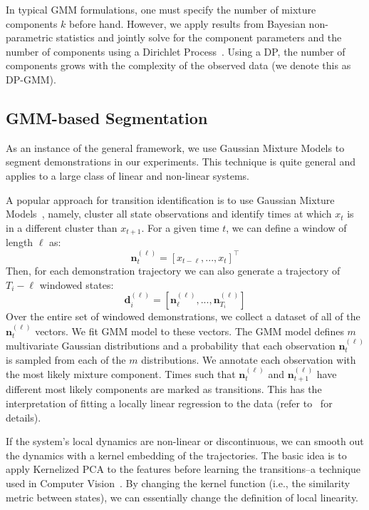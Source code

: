 In typical GMM formulations, one must specify the number of mixture components $k$ before hand.
However, we apply results from Bayesian non-parametric statistics and jointly solve for the component parameters and the number of components using a Dirichlet Process~\cite{kulis2011revisiting}.
Using a DP, the number of components grows with the complexity of the observed data (we denote this as DP-GMM).

\subsection{GMM-based Segmentation}\label{segm}
As an instance of the general framework, we use Gaussian Mixture Models to segment demonstrations in our experiments.
This technique is quite general and applies to a large class of linear and non-linear systems.

A popular approach for transition identification is to use Gaussian Mixture Models~\cite{calinon2014skills}, namely, cluster all state observations and identify times at which $x_t$ is in a different cluster than $x_{t+1}$.
For a given time $t$, we can define a window of length $\ell$ as:
\[
\mathbf{n}^{(\ell)}_t = [x_{t-\ell},...,x_{t}]^\intercal
\]
Then, for each demonstration trajectory we can also generate a trajectory of $T_i - \ell$ windowed states:
\[
\mathbf{d}^{(\ell)}_i = [\mathbf{n}^{(\ell)}_\ell,...,\mathbf{n}^{(\ell)}_{T_i}]
\]
Over the entire set of windowed demonstrations, we collect a dataset of all of the $\mathbf{n}^{(\ell)}_t$ vectors.
We fit GMM model to these vectors.
The GMM model defines $m$ multivariate Gaussian distributions and a probability that each observation $\mathbf{n}^{(\ell)}_t$ is sampled from each of the $m$ distributions.
We annotate each observation with the most likely mixture component.
Times such that $\mathbf{n}^{(\ell)}_t$ and $\mathbf{n}^{(\ell)}_{t+1}$ have different most likely components are marked as transitions.
This has the interpretation of fitting a locally linear regression to the data (refer to~\cite{moldovan2013dirichlet, khansari2011learning, kruger2010learning, krishnan2015tsc,murali2016} for details).

If the system's local dynamics are non-linear or discontinuous, we can smooth out the dynamics with a kernel embedding of the trajectories.
The basic idea is to apply Kernelized PCA to the features before learning the transitions--a technique used in Computer Vision~\cite{DBLP:conf/nips/MikaSSMSR98}.
By changing the kernel function (i.e., the similarity metric between states), we can essentially change the definition of local linearity.

